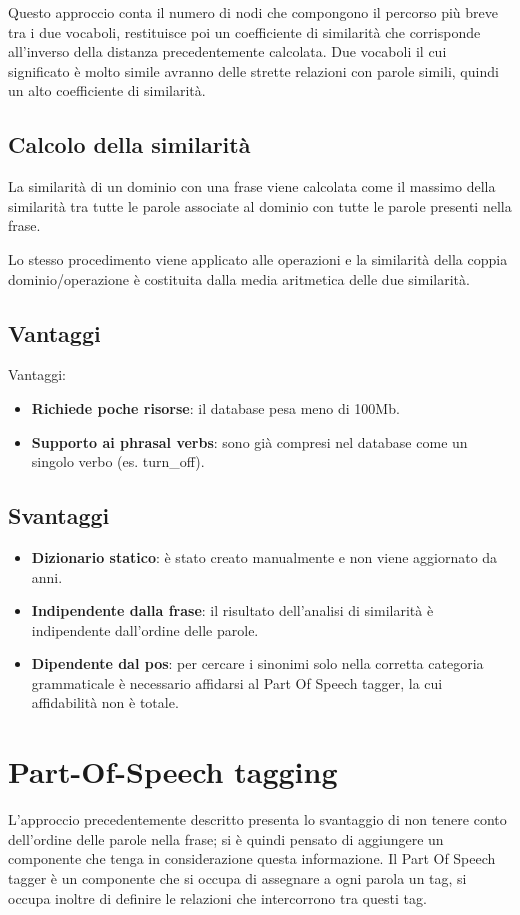 \documentclass[twoside]{supsistudent}
\begin{document}
Questo approccio conta il numero di nodi che compongono il percorso più breve tra i due vocaboli, restituisce poi un coefficiente di similarità che corrisponde all'inverso della distanza precedentemente calcolata. Due vocaboli il cui significato è molto simile avranno delle strette relazioni con parole simili, quindi un alto coefficiente di similarità.\cite{wordNetPathSimilarity}
\subsection{Calcolo della similarità}
La similarità di un dominio con una frase viene calcolata come il massimo della similarità tra tutte le parole associate al dominio con tutte le parole presenti nella frase.

Lo stesso procedimento viene applicato alle operazioni e la similarità della coppia dominio/operazione è costituita dalla media aritmetica delle due similarità.
\subsection{Vantaggi}
Vantaggi:
 \begin{itemize}
  \item \textbf{Richiede poche risorse}: il database pesa meno di 100Mb.
  \item \textbf{Supporto ai phrasal verbs}: sono già compresi nel database come un singolo verbo (es. turn\_off).
\end{itemize}
\subsection{Svantaggi}
\begin{itemize}
  \item \textbf{Dizionario statico}: è stato creato manualmente e non viene aggiornato da anni.  
  \item \textbf{Indipendente dalla frase}: il risultato dell'analisi di similarità è indipendente dall'ordine delle parole.
  \item \textbf{Dipendente dal pos}: per cercare i sinonimi solo nella corretta categoria grammaticale è necessario affidarsi al Part Of Speech tagger, la cui affidabilità non è totale.
\end{itemize}
\newpage
\section{Part-Of-Speech tagging}
L'approccio precedentemente descritto presenta lo svantaggio di non tenere conto dell'ordine delle parole nella frase; si è quindi pensato di aggiungere un componente che tenga in considerazione questa informazione.
Il Part Of Speech tagger è un componente che si occupa di assegnare a ogni parola un tag, si occupa inoltre di definire le relazioni che intercorrono tra questi tag.\cite{pos}\cite{posCategories}
\end{document}
